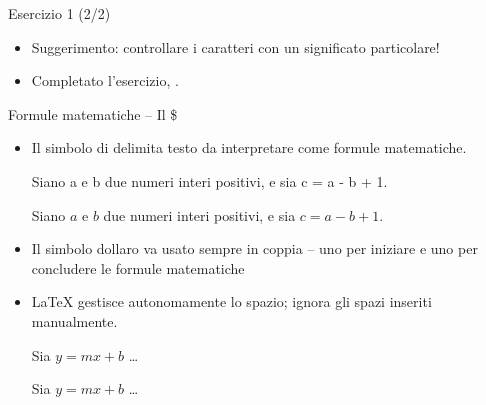 \documentclass{beamer}
\begin{document}
\begin{frame}[fragile]{\centerline{Esercizio 1 (2/2)}}


\begin{center}
\end{center}

\begin{itemize}
\item Suggerimento: controllare i caratteri con un significato particolare!
\item Completato l'esercizio,
.
\end{itemize}
\end{frame}

\begin{frame}[fragile]{\centerline{Formule matematiche -- Il \$}}
\begin{itemize}
\item Il simbolo di \keystrokebftt{\$} delimita testo da interpretare come formule matematiche.\\[1ex]
\begin{exampletwouptiny}
Siano a e b due numeri interi
positivi, e sia c = a - b + 1.

Siano $a$ e $b$ due numeri interi
positivi, e sia $c = a - b + 1$.
\end{exampletwouptiny}
\item Il simbolo dollaro va usato sempre in coppia -- uno per iniziare e uno per concludere le formule matematiche
\item \LaTeX{} gestisce autonomamente lo spazio; ignora gli spazi inseriti manualmente.
\begin{exampletwouptiny}
Sia $y=mx+b$  \ldots

Sia $y = m x + b$  \ldots
\end{exampletwouptiny}
\end{itemize}
\end{frame}
\end{document}
